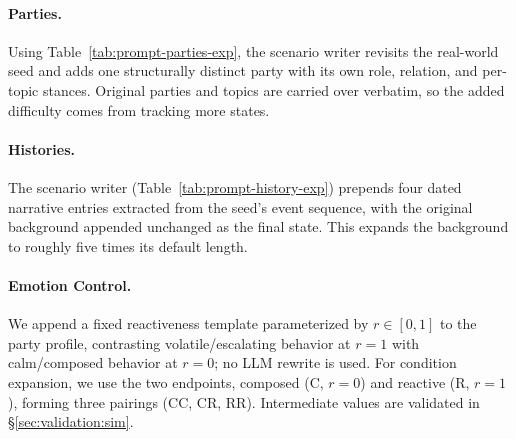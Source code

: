 \paragraph{Parties.}
Using Table~\ref{tab:prompt-parties-exp}, the scenario writer revisits the real-world seed and adds one structurally distinct party with its own role, relation, and per-topic stances. Original parties and topics are carried over verbatim, so the added difficulty comes from tracking more states.

\paragraph{Histories.}
The scenario writer (Table~\ref{tab:prompt-history-exp}) prepends four dated narrative entries extracted from the seed's event sequence, with the original background appended unchanged as the final state. This expands the background to roughly five times its default length.

\paragraph{Emotion Control.}
We append a fixed reactiveness template parameterized by $r \in [0,1]$ to the party profile, contrasting volatile/escalating behavior at $r{=}1$ with calm/composed behavior at $r{=}0$; no LLM rewrite is used. For condition expansion, we use the two endpoints, composed (C, $r{=}0$) and reactive (R, $r{=}1$), forming three pairings (CC, CR, RR). Intermediate values are validated in \S\ref{sec:validation:sim}.

